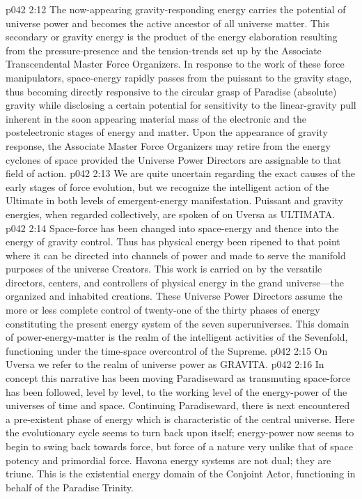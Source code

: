 \pc \vs p042 2:12 \bibnobreakspace {} The now\hyp{}appearing gravity\hyp{}responding energy carries the potential of universe power and becomes the active ancestor of all universe matter. This secondary or gravity energy is the product of the energy elaboration resulting from the pressure\hyp{}presence and the tension\hyp{}trends set up by the Associate Transcendental Master Force Organizers. In response to the work of these force manipulators, space\hyp{}energy rapidly passes from the puissant to the gravity stage, thus becoming directly responsive to the circular grasp of Paradise (absolute) gravity while disclosing a certain potential for sensitivity to the linear\hyp{}gravity pull inherent in the soon appearing material mass of the electronic and the postelectronic stages of energy and matter. Upon the appearance of gravity response, the Associate Master Force Organizers may retire from the energy cyclones of space provided the Universe Power Directors are assignable to that field of action.
\pc \vs p042 2:13 We are quite uncertain regarding the exact causes of the early stages of force evolution, but we recognize the intelligent action of the Ultimate in both levels of emergent\hyp{}energy manifestation. Puissant and gravity energies, when regarded collectively, are spoken of on Uversa as ULTIMATA.
\pc \vs p042 2:14 \bibnobreakspace {} Space\hyp{}force has been changed into space\hyp{}energy and thence into the energy of gravity control. Thus has physical energy been ripened to that point where it can be directed into channels of power and made to serve the manifold purposes of the universe Creators. This work is carried on by the versatile directors, centers, and controllers of physical energy in the grand universe---the organized and inhabited creations. These Universe Power Directors assume the more or less complete control of twenty\hyp{}one of the thirty phases of energy constituting the present energy system of the seven superuniverses. This domain of power\hyp{}energy\hyp{}matter is the realm of the intelligent activities of the Sevenfold, functioning under the time\hyp{}space overcontrol of the Supreme.
\vs p042 2:15 On Uversa we refer to the realm of universe power as GRAVITA.
\pc \vs p042 2:16 \bibnobreakspace {} In concept this narrative has been moving Paradiseward as transmuting space\hyp{}force has been followed, level by level, to the working level of the energy\hyp{}power of the universes of time and space. Continuing Paradiseward, there is next encountered a pre\hyp{}existent phase of energy which is characteristic of the central universe. Here the evolutionary cycle seems to turn back upon itself; energy\hyp{}power now seems to begin to swing back towards force, but force of a nature very unlike that of space potency and primordial force. Havona energy systems are not dual; they are triune. This is the existential energy domain of the Conjoint Actor, functioning in behalf of the Paradise Trinity.
